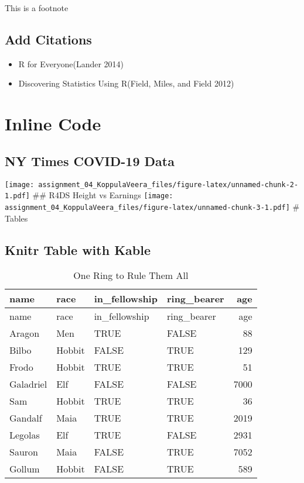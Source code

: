 \documentclass[
]{article}
\providecommand{\tightlist}{%
  \setlength{\itemsep}{0pt}\setlength{\parskip}{0pt}}
\begin{document}
This is a footnote

\hypertarget{add-citations}{%
\subsection{Add Citations}\label{add-citations}}

\begin{itemize}
\tightlist
\item
  R for Everyone(Lander 2014)
\item
  Discovering Statistics Using R(Field, Miles, and Field 2012)
\end{itemize}

\hypertarget{inline-code}{%
\section{Inline Code}\label{inline-code}}

\hypertarget{ny-times-covid-19-data}{%
\subsection{NY Times COVID-19 Data}\label{ny-times-covid-19-data}}

\texttt{[image: assignment\_04\_KoppulaVeera\_files/figure-latex/unnamed-chunk-2-1.pdf]}
\#\# R4DS Height vs Earnings
\texttt{[image: assignment\_04\_KoppulaVeera\_files/figure-latex/unnamed-chunk-3-1.pdf]}
\# Tables

\hypertarget{knitr-table-with-kable}{%
\subsection{Knitr Table with Kable}\label{knitr-table-with-kable}}

\begin{longtable}[]{@{}llllr@{}}
\caption{One Ring to Rule Them All}\tabularnewline
\toprule
name & race & in\_fellowship & ring\_bearer & age \\
\midrule
\endfirsthead
\toprule
name & race & in\_fellowship & ring\_bearer & age \\
\midrule
\endhead
Aragon & Men & TRUE & FALSE & 88 \\
Bilbo & Hobbit & FALSE & TRUE & 129 \\
Frodo & Hobbit & TRUE & TRUE & 51 \\
Galadriel & Elf & FALSE & FALSE & 7000 \\
Sam & Hobbit & TRUE & TRUE & 36 \\
Gandalf & Maia & TRUE & TRUE & 2019 \\
Legolas & Elf & TRUE & FALSE & 2931 \\
Sauron & Maia & FALSE & TRUE & 7052 \\
Gollum & Hobbit & FALSE & TRUE & 589 \\
\bottomrule
\end{longtable}
\end{document}
